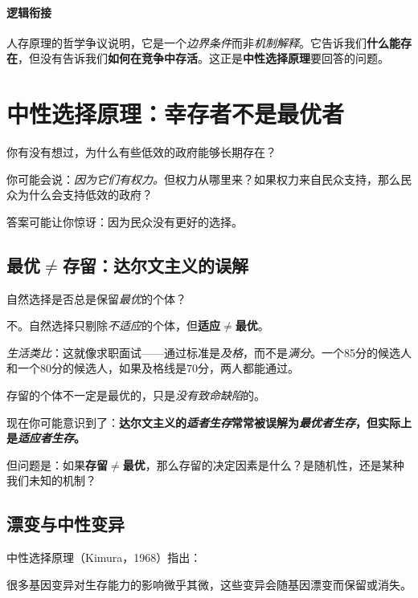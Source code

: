 \documentclass[../main.tex]{subfiles}
\begin{document}
	\paragraph*{逻辑衔接}
	人存原理的哲学争议说明，它是一个\textit{边界条件}而非\textit{机制解释}。它告诉我们\textbf{什么能存在}，但没有告诉我们\textbf{如何在竞争中存活}。这正是\textbf{中性选择原理}要回答的问题。

	\section{中性选择原理：幸存者不是最优者}\label{ch:neutral_evolution}

	你有没有想过，为什么有些低效的政府能够长期存在？

	你可能会说：\textit{因为它们有权力。}但权力从哪里来？如果权力来自民众支持，那么民众为什么会支持低效的政府？

	答案可能让你惊讶：因为民众没有更好的选择。

	\subsection{最优$\neq$存留：达尔文主义的误解}

	自然选择是否总是保留\textit{最优}的个体？

	不。自然选择只剔除\textit{不适应}的个体，但\textbf{适应$\neq$最优}。

	\textit{生活类比}：这就像求职面试——通过标准是\textit{及格}，而不是\textit{满分}。一个85分的候选人和一个80分的候选人，如果及格线是70分，两人都能通过。

	存留的个体不一定是最优的，只是\textit{没有致命缺陷}的。

	\begin{tcolorbox}[colback=yellow!5, title=\textit{读者行为预测}]
		现在你可能意识到了：\textbf{达尔文主义的\textit{适者生存}常常被误解为\textit{最优者生存}，但实际上是\textit{适应者生存}。}
	\end{tcolorbox}

	但问题是：如果\textbf{存留$\neq$最优}，那么存留的决定因素是什么？是随机性，还是某种我们未知的机制？

	\subsection{漂变与中性变异}

	中性选择原理（Kimura，1968）指出：

	很多基因变异对生存能力的影响微乎其微，这些变异会随基因漂变而保留或消失。
\end{document}
